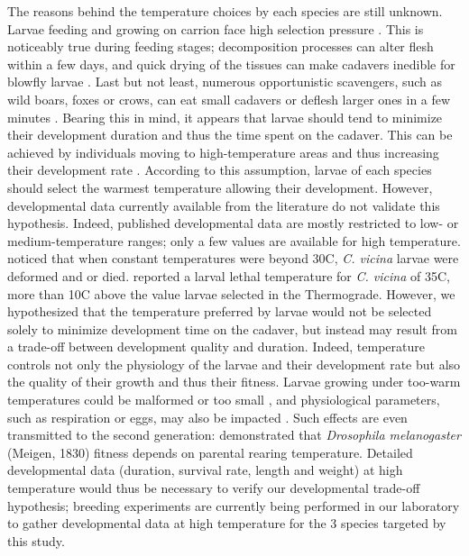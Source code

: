 The reasons behind the temperature choices by each species are still unknown. Larvae feeding and growing on carrion face high selection pressure \cite{campobasso_factors_2001}. This is noticeably true during feeding stages; decomposition processes can alter flesh within a few days, and quick drying of the tissues can make cadavers inedible for blowfly larvae \cite{clark_postmortem_1997}. Last but not least, numerous opportunistic scavengers, such as wild boars, foxes or crows, can eat small cadavers or deflesh larger ones in a few minutes \cite{haglund_dog_1997}. Bearing this in mind, it appears that larvae should tend to minimize their development duration and thus the time spent on the cadaver. This can be achieved by individuals moving to high-temperature areas and thus increasing their development rate \cite{grassberger_effect_2001}. According to this assumption, larvae of each species should select the warmest temperature allowing their development. However, developmental data currently available from the literature do not validate this hypothesis. Indeed, published developmental data are mostly restricted to low- or medium-temperature ranges; only a few values are available for high temperature. \citet{reiter_growth_1984} noticed that when constant temperatures were beyond 30C, \textit{C. vicina} larvae were deformed and or died. \citet{donovan_larval_2006} reported a larval lethal temperature for \textit{C. vicina} of 35C, more than 10C above the value larvae selected in the Thermograde. However, we hypothesized that the temperature preferred by larvae would not be selected solely to minimize development time on the cadaver, but instead may result from a trade-off between development quality and duration. Indeed, temperature controls not only the physiology of the larvae and their development rate \cite{chapman_insects:_1998} but also the quality of their growth and thus their fitness. Larvae growing under too-warm temperatures could be malformed or too small \cite{reiter_growth_1984}, and physiological parameters, such as respiration or eggs, may also be impacted \cite{williams_growth_1984}. Such effects are even transmitted to the second generation: \citet{zamudio_bigger_1995} demonstrated that \textit{Drosophila melanogaster} (Meigen, 1830) fitness depends on parental rearing temperature. Detailed developmental data (duration, survival rate, length and weight) at high temperature would thus be necessary to verify our developmental trade-off hypothesis; breeding experiments are currently being performed in our laboratory to gather developmental data at high temperature for the 3 species targeted by this study.

